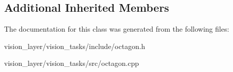 \subsection*{Additional Inherited Members}


The documentation for this class was generated from the following files\+:\begin{DoxyCompactItemize}
\item 
vision\+\_\+layer/vision\+\_\+tasks/include/octagon.\+h\item 
vision\+\_\+layer/vision\+\_\+tasks/src/octagon.\+cpp\end{DoxyCompactItemize}
